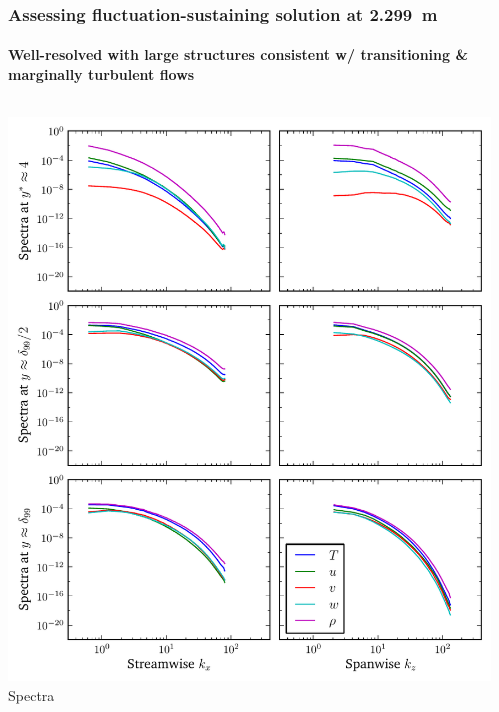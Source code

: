 \documentclass[mathserif]{beamer}
\begin{document}
\begin{frame}
    \frametitle{Assessing fluctuation-sustaining solution at 2.299~m}
    \framesubtitle{Well-resolved with large structures consistent w/ transitioning \& marginally turbulent flows}
    \begin{columns}
        \begin{column}{0.5\linewidth}
          \centering
          \includegraphics[width=\textwidth]{spectra-redux2299}
          \\\vspace{-0.5em}
          Spectra
        \end{column}
        \begin{column}{0.5\linewidth}
          \centering

\end{column}
\end{columns}
\end{frame}
\end{document}
